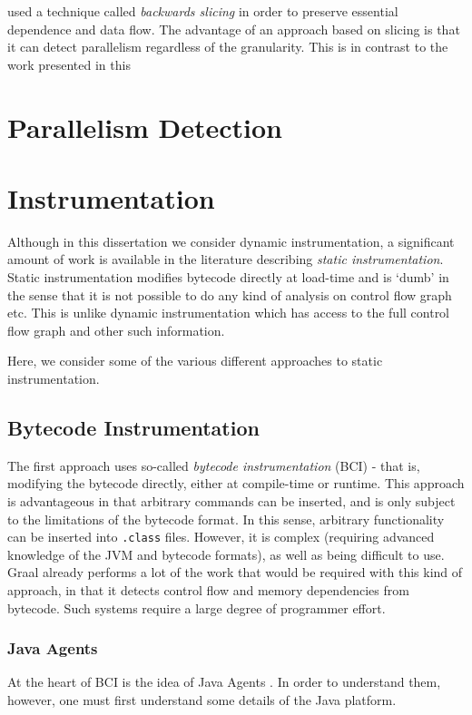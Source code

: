 \citet{Wang2009} used a technique called \textit{backwards slicing} \citep{Weiser} in order to preserve essential dependence and data flow. The advantage of an approach based on slicing is that it can detect parallelism regardless of the granularity. This is in contrast to the work presented in this 

\citet{Ketterlin}

\citet{Dong}

\section{Parallelism Detection} \label{sec:related/detection}

\section{Instrumentation} \label{sec:related/instrumentation}
Although in this dissertation we consider dynamic instrumentation, a significant amount of work is available in the literature describing \emph{static instrumentation}. Static instrumentation modifies bytecode directly at load-time and is `dumb' in the sense that it is not possible to do any kind of analysis on control flow graph etc. This is unlike dynamic instrumentation which has access to the full control flow graph and other such information.

Here, we consider some of the various different approaches to static instrumentation.

\subsection{Bytecode Instrumentation} \label{sec:instrumentation/bytecode-instr}
The first approach uses so-called \textit{bytecode instrumentation} (BCI) - that is, modifying the bytecode directly, either at compile-time or runtime. This approach is advantageous in that arbitrary commands can be inserted, and is only subject to the limitations of the bytecode format. In this sense, arbitrary functionality can be inserted into \texttt{.class} files. However, it is complex (requiring advanced knowledge of the JVM and bytecode formats), as well as being difficult to use. Graal already performs a lot of the work that would be required with this kind of approach, in that it detects control flow and memory dependencies from bytecode. Such systems require a large degree of programmer effort.

	\subsubsection{Java Agents} \label{sec:instrumentation/bytecode-instr/agents}
	At the heart of BCI is the idea of Java Agents \citep{javaagents}. In order to understand them, however, one must first understand some details of the Java platform.
		
